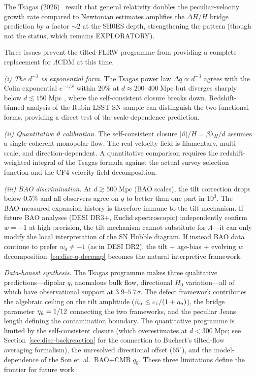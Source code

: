 The Tsagas (2026)~\cite{Tsagas2026ApJ} result that general
relativity doubles the peculiar-velocity growth rate compared
to Newtonian estimates amplifies the $\Delta H/H$ bridge prediction
by a factor $\sim 2$ at the SH0ES depth, strengthening the
pattern (though not the status, which remains EXPLORATORY).

Three issues prevent the tilted-FLRW programme from providing
a complete replacement for $\Lambda$CDM at this time.

\emph{(i) The $d^{-3}$ vs exponential form.}
The Tsagas power law $\Delta q \propto d^{-3}$ agrees with the
Colin exponential $e^{-z/S}$ within $20\%$ at
$d \approx 200$--$400\;\mathrm{Mpc}$ but diverges sharply
below $d \lesssim 150\;\mathrm{Mpc}$
, where the self-consistent
closure breaks down.  Redshift-binned analysis of the Rubin LSST
SN sample can distinguish the two functional forms, providing a
direct test of the scale-dependence prediction.

\emph{(ii) Quantitative $\vartheta$ calibration.}
The self-consistent closure $|\vartheta|/H = \beta\lambda_H/d$
assumes a single coherent monopolar flow.  The real velocity
field is filamentary, multi-scale, and direction-dependent.  A
quantitative comparison requires the redshift-weighted integral
of the Tsagas formula against the actual survey selection function
and the CF4 velocity-field decomposition.

\emph{(iii) BAO discrimination.}
At $d \gtrsim 500\;\mathrm{Mpc}$ (BAO scales), the tilt
correction drops below $0.5\%$ and all observers agree on $q$
to better than one part in $10^3$.  The BAO-measured expansion
history is therefore immune to the tilt mechanism.  If future BAO
analyses (DESI DR3+, Euclid spectroscopic) independently confirm
$w = -1$ at high precision, the tilt mechanism cannot substitute
for $\Lambda$---it can only modify the local interpretation of
the SN Hubble diagram.  If instead BAO data continue to prefer
$w_0 \neq -1$ (as in DESI DR2), the tilt + age-bias + evolving
$w$ decomposition~\eqref{eq:disc-q-decomp} becomes the natural
interpretive framework.

\emph{Data-honest synthesis.}
The Tsagas programme makes three qualitative predictions---dipolar
$q$, anomalous bulk flow, directional $H_0$ variation---all of
which have observational support at $3.9$--$5.7\sigma$.  The
defect framework contributes the algebraic ceiling on the tilt
amplitude ($\beta_{\mathrm{sr}} \leq \varepsilon_1/(1 + \eta_{\dot{u}})$), the bridge
parameter $\eta_{\dot{u}} = 1/12$ connecting the two frameworks, and the
peculiar Jeans length defining the contamination boundary.  The
quantitative programme is limited by the self-consistent closure
(which overestimates at $d < 300\;\mathrm{Mpc}$; see
Section~\ref{sec:disc-backreaction} for the connection to
Buchert's tilted-flow averaging formalism), the unresolved
directional offset ($65^\circ$), and the model-dependence of the
Son et~al.\ BAO+CMB $q_0$.  These three limitations define the
frontier for future work.

